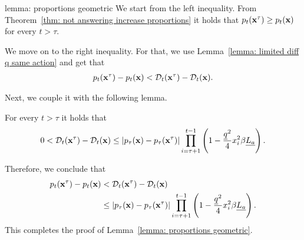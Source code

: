 \begin{proofof}{lemma: proportions geometric}
We start from the left inequality. From Theorem~\ref{thm: not answering increase proportions} it holds that $p_t({\bf{x}}^\tau) \geq p_t({\bf{x}})$ for every $t > \tau$.

We move on to the right inequality. For that, we use Lemma~\ref{lemma: limited diff q same action} and get that
\begin{align*}
p_t({\bf{x}}^\tau) - p_t({\bf{x}}) < \mathcal{D}_t({\bf{x}}^\tau) - \mathcal{D}_t({\bf{x}}).
\end{align*}

Next, we couple it with the following lemma.
\begin{lemma} \label{converging proportions}
For every $t > \tau$ it holds that
\begin{align*}
0 < \mathcal{D}_t({\bf{x}}^\tau) - \mathcal{D}_t({\bf{x}}) \leq \left| p_\tau({\bf{x}}) - p_\tau({\bf{x}}^\tau) \right| \prod_{i = \tau + 1}^{t-1} \left( 1 - \frac{\underline{q} ^2}{4} x_i^2 \beta \underline{L_a} \right).
\end{align*}
\end{lemma}
Therefore, we conclude that
\begin{align*}
p_t({\bf{x}}^\tau) - p_t({\bf{x}}) &< \mathcal{D}_t({\bf{x}}^\tau) - \mathcal{D}_t({\bf{x}})\\
&\leq \left| p_\tau({\bf{x}}) - p_\tau({\bf{x}}^\tau) \right| \prod_{i = \tau + 1}^{t-1} \left( 1 - \frac{\underline{q} ^2}{4} x_i^2 \beta \underline{L_a} \right).
\end{align*}
This completes the proof of Lemma~\ref{lemma: proportions geometric}.
\end{proofof}
















